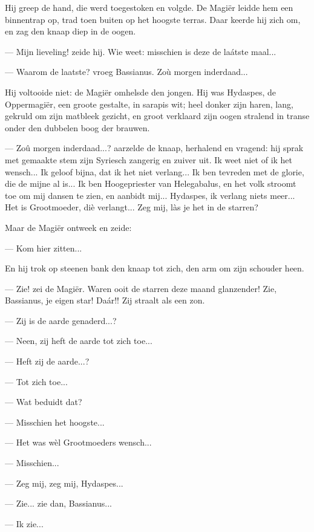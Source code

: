 \documentclass[a4paper, 12pt, oneside, dutch]{article}
\begin{document}
Hij greep de hand, die werd toegestoken en volgde. De Magiër leidde hem een binnentrap op, trad toen buiten op het hoogste terras. Daar keerde hij zich om, en zag den knaap diep in de oogen.

--- Mijn lieveling! zeide hij. Wie weet: misschien is deze de laátste maal...

--- Waarom de laatste? vroeg Bassianus. Zoù morgen inderdaad...

Hij voltooide niet: de Magiër omhelsde den jongen. Hij was Hydaspes, de Oppermagiër, een groote gestalte, in sarapis wit; heel donker zijn haren, lang, gekruld om zijn matbleek gezicht, en groot verklaard zijn oogen stralend in transe onder den dubbelen boog der brauwen.

--- Zoû morgen inderdaad...? aarzelde de knaap, herhalend en vragend: hij sprak met gemaakte stem zijn Syriesch zangerig en zuiver uit. Ik weet niet of ik het wensch... Ik geloof bijna, dat ik het niet verlang... Ik ben tevreden met de glorie, die de mijne al is... Ik ben Hoogepriester van Helegabalus, en het volk stroomt toe om mij dansen te zien, en aanbidt mij... Hydaspes, ik verlang niets meer... Het is Grootmoeder, diè verlangt... Zeg mij, làs je het in de starren?

Maar de Magiër ontweek en zeide:

--- Kom hier zitten...

En hij trok op steenen bank den knaap tot zich, den arm om zijn schouder heen.

--- Zie! zei de Magiër. Waren ooit de starren deze maand glanzender! Zie, Bassianus, je eigen star! Daár!! Zij straalt als een zon.

--- Zij is de aarde genaderd...?

--- Neen, zij heft de aarde tot zich toe...

--- Heft zij de aarde...?

--- Tot zich toe...

--- Wat beduidt dat?

--- Misschien het hoogste...

--- Het was wèl Grootmoeders wensch...

--- Misschien...

--- Zeg mij, zeg mij, Hydaspes...

--- Zie... zie dan, Bassianus...

--- Ik zie...
\end{document}
